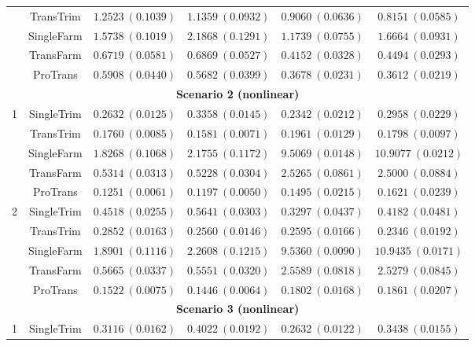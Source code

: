 \documentclass[12pt]{article}
\begin{document}
\begin{table}[!ht]
\begin{tabular}{cccccc}
        & TransTrim   & $1.2523\ (0.1039)$ & $1.1359\ (0.0932)$ & $0.9060\ (0.0636)$ & $0.8151\ (0.0585)$ \\
        & SingleFarm  & $1.5738\ (0.1019)$ & $2.1868\ (0.1291)$ & $1.1739\ (0.0755)$ & $1.6664\ (0.0931)$ \\
        & TransFarm   & $0.6719\ (0.0581)$ & $0.6869\ (0.0527)$ & $0.4152\ (0.0328)$ & $0.4494\ (0.0293)$ \\
        & ProTrans    & $\bm{0.5908}\ (0.0440)$ & $\bm{0.5682}\ (0.0399)$ & $\bm{0.3678}\ (0.0231)$ & $\bm{0.3612}\ (0.0219)$  \\
        \hline
         \multicolumn{6}{c}{\textbf{Scenario 2 (nonlinear)}}\\
         \hline
         \multirow{5}{*}{1} 
        & SingleTrim & $0.2632\ (0.0125)$ & $0.3358\ (0.0145)$ & $0.2342\ (0.0212)$ & $0.2958\ (0.0229)$ \\
        & TransTrim  & $0.1760\ (0.0085)$ & $0.1581\ (0.0071)$ & $0.1961\ (0.0129)$ & $0.1798\ (0.0097)$ \\
        & SingleFarm  & $1.8268\ (0.1068)$ & $2.1755\ (0.1172)$ & $9.5069\ (0.0148)$ & $10.9077\ (0.0212)$ \\
        & TransFarm  & $0.5314\ (0.0313)$ & $0.5228\ (0.0304)$ & $2.5265\ (0.0861)$ & $2.5000\ (0.0884)$ \\
        & ProTrans   & $\bm{0.1251}\ (0.0061)$ & $\bm{0.1197}\ (0.0050)$ & $\bm{0.1495}\ (0.0215)$ & $\bm{0.1621}\ (0.0239)$ \\
        \hline
        \multirow{5}{*}{2} 
        & SingleTrim  & $0.4518\ (0.0255)$ & $0.5641\ (0.0303)$ & $0.3297\ (0.0437)$ & $0.4182\ (0.0481)$ \\
        & TransTrim   & $0.2852\ (0.0163)$ & $0.2560\ (0.0146)$ & $0.2595\ (0.0166)$ & $0.2346\ (0.0192)$ \\
        & SingleFarm  & $1.8901\ (0.1116)$ & $2.2608\ (0.1215)$ & $9.5360\ (0.0090)$ & $10.9435\ (0.0171)$ \\
        & TransFarm    & $0.5665\ (0.0337)$ & $0.5551\ (0.0320)$ & $2.5589\ (0.0818)$ & $2.5279\ (0.0845)$ \\
        & ProTrans   & $\bm{0.1522}\ (0.0075)$ & $\bm{0.1446}\ (0.0064)$ & $\bm{0.1802}\ (0.0168)$ & $\bm{0.1861}\ (0.0207)$ \\
                \hline
         \multicolumn{6}{c}{\textbf{Scenario 3 (nonlinear)}}\\
         \hline
         \multirow{5}{*}{1} 
        & SingleTrim & $0.3116\ (0.0162)$ & $0.4022\ (0.0192)$ & $0.2632\ (0.0122)$ & $0.3438\ (0.0155)$ \\

\end{tabular}
\end{table}
\end{document}
